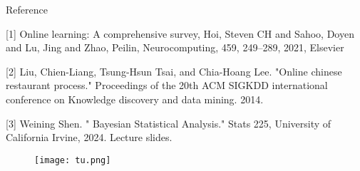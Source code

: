 \documentclass[11pt]{beamer}
\begin{document}
	\begin{frame}{Reference}
		
		\begin{thebibliography}{100}
			
			\bibitem{} 
[1] Online learning: A comprehensive survey,
		Hoi, Steven CH and Sahoo, Doyen and Lu, Jing and Zhao, Peilin,
			Neurocomputing,
			459,
			249--289,
			2021,
			Elsevier
		
		
			
			
			\bibitem{} [2]  Liu, Chien-Liang, Tsung-Hsun Tsai, and Chia-Hoang Lee. "Online chinese restaurant process." Proceedings of the 20th ACM SIGKDD international conference on Knowledge discovery and data mining. 2014.
			
		\bibitem{}[3]	Weining Shen. " Bayesian Statistical Analysis." Stats 225, University of California Irvine, 2024. Lecture slides.
			
			
		\end{thebibliography} 
	\end{frame}
	
	\begin{frame}
		\begin{figure}
			\centering
		 	\texttt{[image: tu.png]} 
		\end{figure}
		
	\end{frame}
\end{document}
